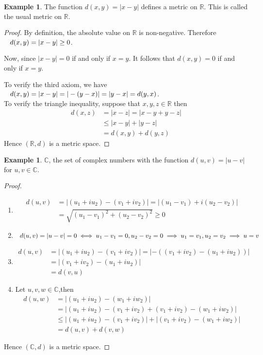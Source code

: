 \documentclass[11pt,a4paper]{article}
\theoremstyle{definition}
\newtheorem{exa}[thm]{Example}
\begin{document}
\begin{exa}
The function $d(x,y)=|x-y|$ defines a metric on $\mathbb{R}$. This is called the usual metric on $\mathbb{R}$.


\end{exa}

\begin{proof}
By definition, the absolute value on $\mathbb{R}$ is non-negative. Therefore  $\hspace{0.3cm} d(x,y)=|x-y|\geq 0$.

Now, since $|x-y|=0$ if and only if $x=y$. It follows that $d(x,y)=0$ if and only if $x=y$.

To verify the third axiom, we have $\hspace{0.3cm} d(x,y)=|x-y|=|-(y-x)|=|y-x|=d(y,x)$.\\To verify the triangle inequality, suppose that $x,y,z\in \mathbb{R}$ then 
\begin{align*}
d(x,z) &=|x-z|=|x-y+y-z|\\
       &\leq |x-y|+|y-z|\\
       &=d(x,y)+d(y,z)
\end{align*} 
Hence $(\mathbb{R},d)$ is a metric space.

\end{proof}


\begin{exa}
$\mathbb{C}$, the set of complex numbers with the function $d(u,v)=|u-v|$ for $u,v\in \mathbb{C}$.

\end{exa}
\begin{proof}
\begin{enumerate}
\item[i] 
\begin{align*}
d(u,v) &=|(u_1+iu_2)-(v_1+iv_2)|
       =|(u_1-v_1)+i(u_2-v_2)|\\
       &=\sqrt{(u_1-v_1)^2+(u_2-v_2)^2}\geq 0
\end{align*}
\item[ii] $\hspace{0.2cm} d(u,v)=|u-v|=0\iff u_1-v_1=0, u_2-v_2=0\implies u_1=v_1,u_2=v_2\implies u=v$
\item[iii]
\begin{align*}
d(u,v) &=|(u_1+iu_2)-(v_1+iv_2)|
        =|-((v_1+iv_2)-(u_1+iu_2))|\\
       &=|(v_1+iv_2)-(u_1+iu_2)|\\
       &=d(v,u)
\end{align*}
\item[iv] Let $u,v,w\in \mathbb{C}$,then
\begin{align*}
d(u,w) &=|(u_1+iu_2)-(w_1+iw_2)|\\
       &=|(u_1+iu_2)-(v_1+iv_2)+(v_1+iv_2)-(w_1+iw_2)|\\
       &\leq |(u_1+iu_2)-(v_1+iv_2)|+|(v_1+iv_2)-(w_1+iw_2)|\\
       &=d(u,v)+d(v,w)
\end{align*}
\end{enumerate}
Hence $(\mathbb{C},d)$ is a metric space.

\end{proof}
\end{document}
